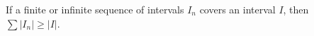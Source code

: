 If a finite or infinite sequence of intervals $I_n$ covers an interval $I$, then $\sum |I_n| \geq |I|$.

